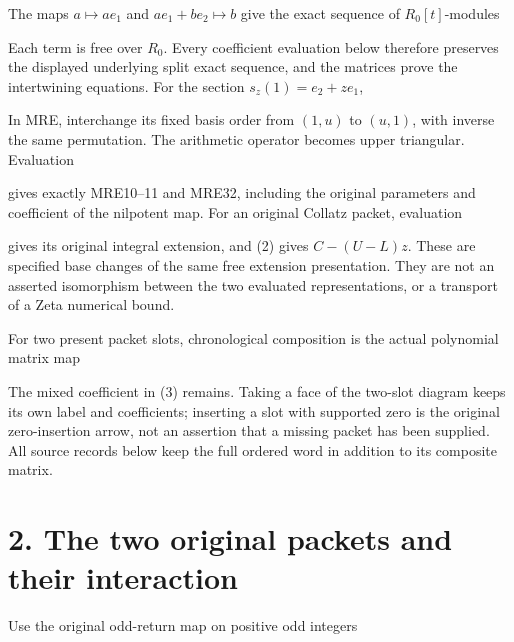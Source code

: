 The maps \(a\mapsto ae_1\) and \(ae_1+be_2\mapsto b\) give the exact
sequence of \(R_0[t]\)-modules


Each term is free over \(R_0\). Every coefficient evaluation below
therefore preserves the displayed underlying split exact sequence, and
the matrices prove the intertwining equations. For the section
\(s_z(1)=e_2+ze_1\),


In MRE, interchange its fixed basis order from \((1,u)\) to \((u,1)\),
with inverse the same permutation. The arithmetic operator becomes upper
triangular. Evaluation


gives exactly MRE10--11 and MRE32, including the original parameters and
coefficient of the nilpotent map. For an original Collatz packet,
evaluation


gives its original integral extension, and (2) gives \(C-(U-L)z\). These
are specified base changes of the same free extension presentation. They
are not an asserted isomorphism between the two evaluated
representations, or a transport of a Zeta numerical bound.

For two present packet slots, chronological composition is the actual
polynomial matrix map


The mixed coefficient in (3) remains. Taking a face of the two-slot
diagram keeps its own label and coefficients; inserting a slot with
supported zero is the original zero-insertion arrow, not an assertion
that a missing packet has been supplied. All source records below keep
the full ordered word in addition to its composite matrix.

\section{2. The two original packets and their interaction}

Use the original odd-return map on positive odd integers

